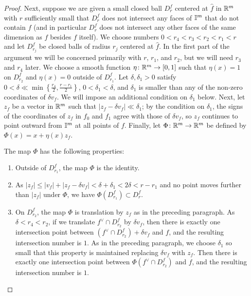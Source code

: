 \begin{proof}
	Next, suppose we are given a small closed ball $D^f_r$ centered at $\hat f$ in $\mathbb{R}^m$ with $r$ sufficiently small that $D^f_r$ does not intersect any faces of $\mathbb{I}^m$ that do not contain $f$ (and in particular $D^f_r$ does not intersect any other faces of the same dimension as $f$ besides $f$ itself).
	We choose numbers $0<r_4 < r_3 < r_2<r_1<r$ and let $D^f_{r_j}$ be closed balls of radius $r_j$ centered at $\hat f$.
	In the first part of the argument we will be concerned primarily with $r$, $r_1$, and $r_2$, but we will need $r_3$ and $r_4$ later.
	We choose a smooth function $\eta \colon \mathbb{R}^m \to [0,1]$ such that $\eta(x) = 1$ on $D^f_{r_2}$ and $\eta(x) = 0$ outside of $D^f_{r_1}$.
	Let $\delta, \delta_1 > 0$ satisfy $0 < \delta \ll \min\left\{\frac{r_4}{2}, \frac{r-r_1}{2}\right\}$, $0 < \delta_1 < \delta$, and $\delta_1$ is smaller than any of the non-zero coordinates of $\delta v_f$.
	We will impose an additional condition on $\delta_1$ below.
	Next, let $z_f$ be a vector in $\mathbb{R}^m$ such that $|z_f-\delta v_f|\ll \delta_1$; by the condition on $\delta_1$, the signs of the coordinates of $z_f$ in $f_0$ and $f_1$ agree with those of $\delta v_f$, so $z_f$ continues to point outward from $\mathbb{I}^m$ at all points of $f$.
	Finally, let $\Phi \colon \mathbb{R}^m \to \mathbb{R}^m$ be defined by $\Phi(x) = x+ \eta(x) z_f$.

	The map $\Phi$ has the following properties:
	\begin{enumerate}
		\item Outside of $D^f_{r_1}$, the map $\Phi$ is the identity.

		\item As $|z_f|\leq |v_f| + |z_f-\delta v_f| < \delta+\delta_1 < 2 \delta < r-r_1$ and no point moves further than $|z_f|$ under $\Phi$, we have $\Phi(D^f_{r_1})\subset D^f_r$.

		\item On $D_{r_2}^f$, the map $\Phi$ is translation by $z_f$ as in the preceding paragraph.
		As $\delta < r_4 < r_2$, if we translate $f^\vee \cap D_{r_2}^f$ by $\delta v_f$, then there is exactly one intersection point between $(f^\vee \cap D_{r_2}^f) + \delta v_f$ and $f$, and the resulting intersection number is $1$.
		As in the preceding paragraph, we choose $\delta_1$ so small that this property is maintained replacing $\delta v_f$ with $z_f$.
		Then there is exactly one intersection point between $\Phi(f^\vee \cap D_{r_2}^f)$ and $f$, and the resulting intersection number is $1$.

\end{enumerate}
\end{proof}
